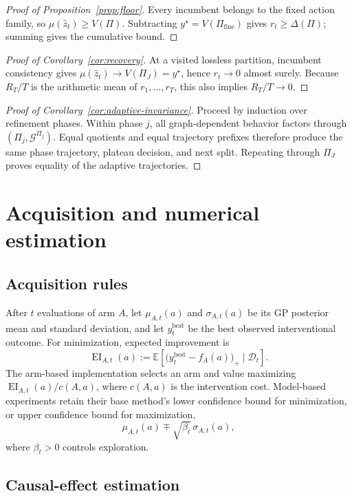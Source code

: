 \documentclass[twoside]{article}
\newcommand{\E}{\mathbb{E}}
\newcommand{\Gg}{\mathcal{G}}
\begin{document}
\begin{proof}[Proof of Proposition~\ref{prop:floor}]
Every incumbent belongs to the fixed action family, so \(\mu(\hat z_t)\ge V(\Pi)\). Subtracting \(y^\star=V(\Pi_{\mathrm{fine}})\) gives \(r_t\ge\Delta(\Pi)\); summing gives the cumulative bound.
\end{proof}

\begin{proof}[Proof of Corollary~\ref{cor:recovery}]
At a visited lossless partition, incumbent consistency gives \(\mu(\hat z_t)\to V(\Pi_J)=y^\star\), hence \(r_t\to0\) almost surely. Because \(R_T/T\) is the arithmetic mean of \(r_1,\ldots,r_T\), this also implies \(R_T/T\to0\).
\end{proof}

\begin{proof}[Proof of Corollary~\ref{cor:adaptive-invariance}]
Proceed by induction over refinement phases. Within phase \(j\), all graph-dependent behavior factors through \((\Pi_j,\Gg^{\Pi_j})\). Equal quotients and equal trajectory prefixes therefore produce the same phase trajectory, plateau decision, and next split. Repeating through \(\Pi_J\) proves equality of the adaptive trajectories.
\end{proof}
\clearpage
\section{Acquisition and numerical estimation}
\label{app:estimators}

\subsection{Acquisition rules}

After $t$ evaluations of arm $A$, let $\mu_{A,t}(a)$ and $\sigma_{A,t}(a)$ be its GP posterior mean and standard deviation, and let $y_t^{\mathrm{best}}$ be the best observed interventional outcome. For minimization, expected improvement is
\[
 \operatorname{EI}_{A,t}(a)
 :=\E\!\left[
 \bigl(y_t^{\mathrm{best}}-f_A(a)\bigr)_+
 \mid\mathcal D_t\right].
\]
The arm-based implementation selects an arm and value maximizing $\operatorname{EI}_{A,t}(a)/c(A,a)$, where $c(A,a)$ is the intervention cost. Model-based experiments retain their base method's lower confidence bound for minimization, or upper confidence bound for maximization,
\[
 \mu_{A,t}(a)\mp\sqrt{\beta_t}\,\sigma_{A,t}(a),
\]
where $\beta_t>0$ controls exploration.

\subsection{Causal-effect estimation}
\end{document}
